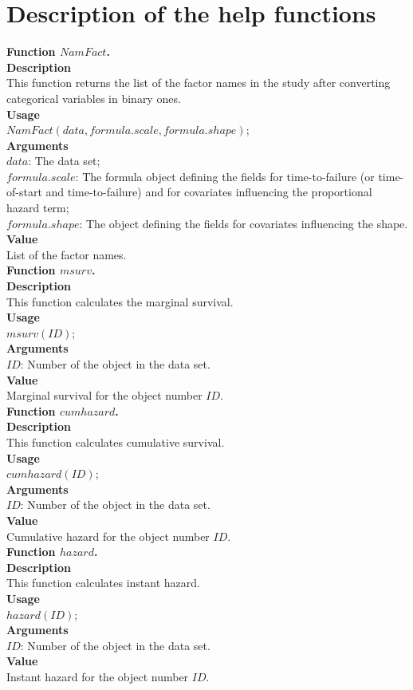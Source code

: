 \documentclass[A4document,12pt]{article}\usepackage[]{graphicx}\usepackage[]{color}
\begin{document}
\section{Description of the help functions}
\noindent
{\textbf{Function $NamFact$.}}\\
\noindent
\textbf{Description}\\
This function returns the list of the factor names in the study after converting categorical variables in binary ones.\\
\textbf{Usage}\\
$NamFact(data,formula.scale,formula.shape)$;\\
\textbf{Arguments}
\\
\noindent
$data$:       The  data set;\\
$formula.scale$:       The  formula object defining the fields for time-to-failure (or time-of-start and time-to-failure) and for covariates influencing the proportional hazard term;\\
\noindent
$formula.shape$:           The object defining the fields for covariates influencing the shape.\\
\textbf{Value}\\
List of the factor names.\\
\noindent
{\textbf{Function $msurv$.}}\\
\noindent
\textbf{Description}\\
This function calculates the marginal survival.\\
\textbf{Usage}\\
$msurv(ID)$;\\
\textbf{Arguments}
\\
\noindent
$ID$: Number of the object in the data set.\\
\textbf{Value}\\
Marginal survival for the object number $ID$.\\
{\textbf{Function $cumhazard$.}}\\
\noindent
\textbf{Description}\\
This function calculates cumulative survival.\\
\textbf{Usage}\\
$cumhazard(ID)$;\\
\textbf{Arguments}
\\
\noindent
$ID$: Number of the object in the data set.\\
\textbf{Value}\\
Cumulative hazard for the object number $ID$.\\
{\textbf{Function $hazard$.}}\\
\noindent
\textbf{Description}\\
This function calculates instant hazard.\\
\textbf{Usage}\\
$hazard(ID)$;\\
\textbf{Arguments}
\\
\noindent
$ID$: Number of the object in the data set.\\
\textbf{Value}\\
Instant hazard for the object number $ID$.\\
\end{document}
